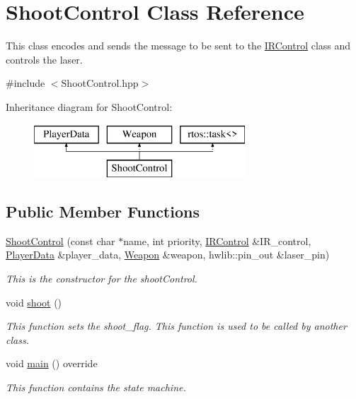 \hypertarget{class_shoot_control}{}\section{Shoot\+Control Class Reference}
\label{class_shoot_control}


This class encodes and sends the message to be sent to the \mbox{\hyperlink{class_i_r_control}{I\+R\+Control}} class and controls the laser.  




{\ttfamily \#include $<$Shoot\+Control.\+hpp$>$}

Inheritance diagram for Shoot\+Control\+:\begin{figure}[H]
\begin{center}
\leavevmode
\includegraphics[height=2.000000cm]{class_shoot_control}
\end{center}
\end{figure}
\subsection*{Public Member Functions}
\begin{DoxyCompactItemize}
\item 
\mbox{\hyperlink{class_shoot_control_af9c21b16c798f217b2da762d569473cd}{Shoot\+Control}} (const char $\ast$name, int priority, \mbox{\hyperlink{class_i_r_control}{I\+R\+Control}} \&I\+R\+\_\+control, \mbox{\hyperlink{class_player_data}{Player\+Data}} \&player\+\_\+data, \mbox{\hyperlink{class_weapon}{Weapon}} \&weapon, hwlib\+::pin\+\_\+out \&laser\+\_\+pin)
\begin{DoxyCompactList}\small\item\em This is the constructor for the shoot\+Control. \end{DoxyCompactList}\item 
\mbox{\label{class_shoot_control_a17f6db4ed8fb3a7195e03eb54b9c26f1}} 
void \mbox{\hyperlink{class_shoot_control_a17f6db4ed8fb3a7195e03eb54b9c26f1}{shoot}} ()
\begin{DoxyCompactList}\small\item\em This function sets the shoot\+\_\+flag.  This function is used to be called by another class. \end{DoxyCompactList}\item 
void \mbox{\hyperlink{class_shoot_control_afda9df061db3b34fdf9affed32f2c325}{main}} () override
\begin{DoxyCompactList}\small\item\em This function contains the state machine. \end{DoxyCompactList}\end{DoxyCompactItemize}


